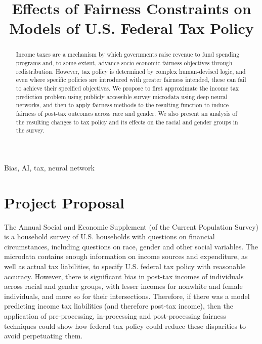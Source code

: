 \documentclass[conference]{IEEEtran}
\begin{document}
\title{Effects of Fairness Constraints on Models of U.S. Federal Tax Policy}

\author{
}

\maketitle

\begin{abstract}
Income taxes are a mechanism by which governments raise revenue to fund spending programs and, to some extent, advance socio-economic fairness objectives through redistribution. However, tax policy is determined by complex human-devised logic, and even where specific policies are introduced with greater fairness intended, these can fail to achieve their specified objectives. We propose to first approximate the income tax prediction problem using publicly accessible survey microdata using deep neural networks, and then to apply fairness methods to the resulting function to induce fairness of post-tax outcomes across race and gender. We also present an analysis of the resulting changes to tax policy and its effects on the racial and gender groups in the survey.
\end{abstract}

\begin{IEEEkeywords}
Bias, AI, tax, neural network
\end{IEEEkeywords}

\section{Project Proposal}
The Annual Social and Economic Supplement (of the Current Population Survey) is a household survey of U.S. households with questions on financial circumstances, including questions on race, gender and other social variables. The microdata contains enough information on income sources and expenditure, as well as actual tax liabilities, to specify U.S. federal tax policy with reasonable accuracy. However, there is significant bias in post-tax incomes of individuals across racial and gender groups, with lesser incomes for nonwhite and female individuals, and more so for their intersections. Therefore, if there was a model predicting income tax liabilities (and therefore post-tax income), then the application of pre-processing, in-processing and post-processing fairness techniques could show how federal tax policy could reduce these disparities to avoid perpetuating them. 
\end{document}
